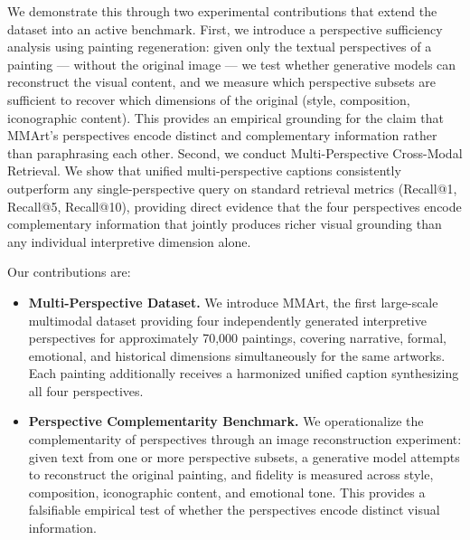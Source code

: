 We demonstrate this through two experimental contributions that extend the dataset into an active benchmark. First, we introduce a perspective sufficiency analysis using painting regeneration: given only the textual perspectives of a painting — without the original image — we test whether generative models can reconstruct the visual content, and we measure which perspective subsets are sufficient to recover which dimensions of the original (style, composition, iconographic content). This provides an empirical grounding for the claim that MMArt's perspectives encode distinct and complementary information rather than paraphrasing each other. Second, we conduct Multi-Perspective Cross-Modal Retrieval. We show that unified multi-perspective captions consistently outperform any single-perspective query on standard retrieval metrics (Recall@1, Recall@5, Recall@10), providing direct evidence that the four perspectives encode complementary information that jointly produces richer visual grounding than any individual interpretive dimension alone.



\noindent Our contributions are:
\begin{itemize}
    \item \textbf{Multi-Perspective Dataset.} We introduce MMArt, the first large-scale multimodal dataset providing four independently generated interpretive perspectives for approximately 70,000 paintings, covering narrative, formal, emotional, and historical dimensions simultaneously for the same artworks. Each painting additionally receives a harmonized unified caption synthesizing all four perspectives.

    \item \textbf{Perspective Complementarity Benchmark.} We operationalize the complementarity of perspectives through an image reconstruction experiment: given text from one or more perspective subsets, a generative model attempts to reconstruct the original painting, and fidelity is measured across style, composition, iconographic content, and emotional tone. This provides a falsifiable empirical test of whether the perspectives encode distinct visual information.
\end{itemize}